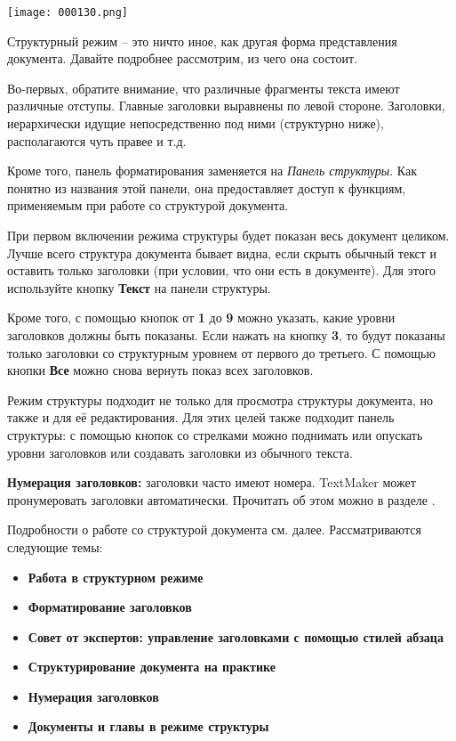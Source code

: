 ﻿\documentclass[a4paper,10pt]{article}
\begin{document}
\texttt{[image: 000130.png]}

Структурный режим -- это ничто иное, как другая форма представления документа. Давайте подробнее рассмотрим, из чего она состоит.

Во-первых, обратите внимание, что различные фрагменты текста имеют различные отступы. Главные заголовки выравнены по левой стороне. Заголовки, иерархически идущие непосредственно под ними (структурно ниже), располагаются чуть правее и т.д.

Кроме того, панель форматирования заменяется на \textit{Панель структуры}. Как понятно из названия этой панели, она предоставляет доступ к функциям, применяемым при работе со структурой документа.

При первом включении режима структуры будет показан весь документ целиком. Лучше всего структура документа бывает видна, если скрыть обычный текст и оставить только заголовки (при условии, что они есть в документе). Для этого используйте кнопку \textbf{Текст} на панели структуры.

Кроме того, с помощью кнопок от \textbf{1} до \textbf{9} можно указать, какие уровни заголовков должны быть показаны. Если нажать на кнопку \textbf{3}, то будут показаны только заголовки со структурным уровнем от первого до третьего. С помощью кнопки \textbf{Все} можно снова вернуть показ всех заголовков.

Режим структуры подходит не только для просмотра структуры документа, но также и для её редактирования. Для этих целей также подходит панель структуры: с помощью кнопок со стрелками можно поднимать или опускать уровни заголовков или создавать заголовки из обычного текста.

\textbf{Нумерация заголовков:} заголовки часто имеют номера. TextMaker может пронумеровать заголовки автоматически. Прочитать об этом можно в разделе .

Подробности о работе со структурой документа см. далее. Рассматриваются следующие темы:

\begin{itemize}
 \item \textbf{Работа в структурном режиме}
 \item \textbf{Форматирование заголовков}
 \item \textbf{Совет от экспертов: управление заголовками с помощью стилей абзаца}
 \item \textbf{Структурирование документа на практике}
 \item \textbf{Нумерация заголовков}
 \item \textbf{Документы и главы в режиме структуры}
\end{itemize}
\end{document}
